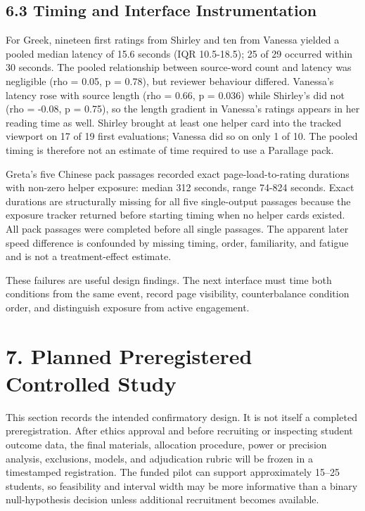 \documentclass[
  12pt,
]{article}
\begin{document}
\subsection{6.3 Timing and Interface
Instrumentation}\label{timing-and-interface-instrumentation}

For Greek, nineteen first ratings from Shirley and ten from Vanessa
yielded a pooled median latency of 15.6 seconds (IQR 10.5-18.5); 25 of
29 occurred within 30 seconds. The pooled relationship between
source-word count and latency was negligible (rho = 0.05, p = 0.78), but
reviewer behaviour differed. Vanessa's latency rose with source length
(rho = 0.66, p = 0.036) while Shirley's did not (rho = -0.08, p = 0.75),
so the length gradient in Vanessa's ratings appears in her reading time
as well. Shirley brought at least one helper card into the tracked
viewport on 17 of 19 first evaluations; Vanessa did so on only 1 of 10.
The pooled timing is therefore not an estimate of time required to use a
Parallage pack.

Greta's five Chinese pack passages recorded exact page-load-to-rating
durations with non-zero helper exposure: median 312 seconds, range
74-824 seconds. Exact durations are structurally missing for all five
single-output passages because the exposure tracker returned before
starting timing when no helper cards existed. All pack passages were
completed before all single passages. The apparent later speed
difference is confounded by missing timing, order, familiarity, and
fatigue and is not a treatment-effect estimate.

These failures are useful design findings. The next interface must time
both conditions from the same event, record page visibility,
counterbalance condition order, and distinguish exposure from active
engagement.

\section{7. Planned Preregistered Controlled
Study}\label{planned-preregistered-controlled-study}

This section records the intended confirmatory design. It is not itself
a completed preregistration. After ethics approval and before recruiting
or inspecting student outcome data, the final materials, allocation
procedure, power or precision analysis, exclusions, models, and
adjudication rubric will be frozen in a timestamped registration. The
funded pilot can support approximately 15--25 students, so feasibility
and interval width may be more informative than a binary null-hypothesis
decision unless additional recruitment becomes available.
\end{document}
